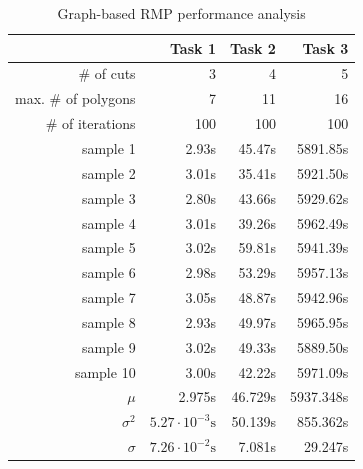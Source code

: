 \documentclass[11pt,a4paper,twoside,openright]{report}
\begin{document}
\begin{table}[h]
\centering
\caption{Graph-based RMP performance analysis}
\label{tab:graphperformanceanalysis}
\begin{tabular}{|r|r|r|r|}
\hline
 & Task 1 & Task 2 & Task 3 \\ \hline
\# of cuts & 3 & 4 & 5 \\ \hline
max. \# of polygons & 7 & 11 & 16 \\ \hline
\# of iterations & 100 & 100 & 100 \\ \hline
sample 1 & 2.93s & 45.47s & 5891.85s \\ \hline
sample 2 & 3.01s & 35.41s & 5921.50s \\ \hline
sample 3 & 2.80s & 43.66s & 5929.62s \\ \hline
sample 4 & 3.01s & 39.26s & 5962.49s \\ \hline
sample 5 & 3.02s & 59.81s & 5941.39s \\ \hline
sample 6 & 2.98s & 53.29s & 5957.13s \\ \hline
sample 7 & 3.05s & 48.87s & 5942.96s \\ \hline
sample 8 & 2.93s & 49.97s & 5965.95s \\ \hline
sample 9 & 3.02s & 49.33s & 5889.50s \\ \hline
sample 10 & 3.00s & 42.22s & 5971.09s \\ \hline
$\mu$ & 2.975s & 46.729s & 5937.348s \\ \hline
$\sigma^2$ & $5.27 \cdot 10^{-3}\textrm{s}$ & 50.139s & 855.362s \\ \hline
$\sigma$ & $7.26 \cdot 10^{-2}\textrm{s}$ & 7.081s & 29.247s \\ \hline
\end{tabular}
\end{table}
\end{document}
